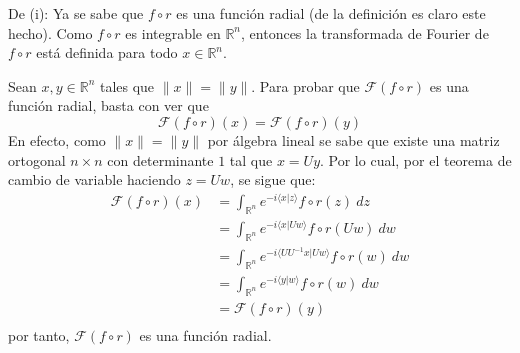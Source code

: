 \documentclass[12pt]{report}
\theoremstyle{largebreak}
\newcommand\norm[1]{\ensuremath{\|#1\|}}
\newcommand\pint[2]{\ensuremath{\langle#1| #2\rangle}}
\newcommand{\fou}[1]{\ensuremath{\mathcal{F}#1}}
\begin{document}
    \begin{sol}
        De (i): Ya se sabe que $f\circ r$ es una función radial (de la definición es claro este hecho). Como $f\circ r$ es integrable en $\mathbb{R}^n$, entonces la transformada de Fourier de $f\circ r$ está definida para todo $x\in\mathbb{R}^n$.
        
        Sean $x,y\in\mathbb{R}^n$ tales que $\norm{x}=\norm{y}$. Para probar que $\fou{(f\circ r)}$ es una función radial, basta con ver que
        \begin{equation*}
            \fou{(f\circ r)}(x)=\fou{(f\circ r)}(y)
        \end{equation*}
        En efecto, como $\norm{x}=\norm{y}$ por álgebra lineal se sabe que existe una matriz ortogonal $n\times n$ con determinante $1$ tal que $x=Uy$. Por lo cual, por el teorema de cambio de variable haciendo $z=Uw$, se sigue que:
        \begin{equation*}
            \begin{split}
                \fou{(f\circ r)}(x)&=\int_{\mathbb{R}^n}e^{-i\pint{x}{z}}f\circ r(z)\:dz\\
                &=\int_{\mathbb{R}^n}e^{ -i\pint{x}{Uw}}f\circ r(Uw)\:dw\\
                &=\int_{\mathbb{R}^n}e^{ -i\pint{UU^{-1}x}{Uw}}f\circ r(w)\:dw\\
                &=\int_{\mathbb{R}^n}e^{ -i\pint{y}{w}}f\circ r(w)\:dw\\
                &=\fou{(f\circ r)}(y)\\
            \end{split}
        \end{equation*}
        por tanto, $\fou{(f\circ r)}$ es una función radial.


\end{sol}
\end{document}
